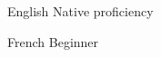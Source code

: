 
\begin{cvskills}

  \cvskill
    {English} %
    {Native proficiency} %

  \cvskill
    {French} %
    {Beginner} %


\end{cvskills}
